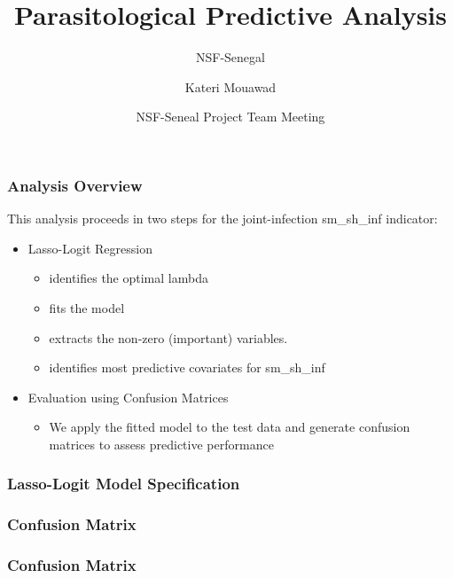\documentclass{beamer}
\title[Predictive Analysis] %
{Parasitological Predictive Analysis}
\subtitle{NSF-Senegal}
\author{Kateri Mouawad} %
\date[June 2025] %
{NSF-Seneal Project Team Meeting}
\begin{document}
\frame{\titlepage}

\begin{frame}
\frametitle{Analysis Overview}
This analysis proceeds in two steps for the joint-infection sm\_sh\_inf indicator:

\begin{itemize}
    \item<1-> Lasso-Logit Regression
       \begin{itemize}
             \item<2-> identifies the optimal lambda
             \item<3-> fits the model
             \item<4-> extracts the non-zero (important) variables.
             \item<5-> identifies most predictive covariates for sm\_sh\_inf
        \end{itemize}
    \item<3-> Evaluation using Confusion Matrices
         \begin{itemize}
                 \item<4-> We apply the fitted model to the test data and generate confusion matrices to assess predictive performance
         \end{itemize}
\end{itemize}

\end{frame}


\begin{frame}
\frametitle{Lasso-Logit Model Specification}




\end{frame}

\begin{frame}
\frametitle{Confusion Matrix}





\end{frame}

\begin{frame}
\frametitle{Confusion Matrix}





\end{frame}
\end{document}
